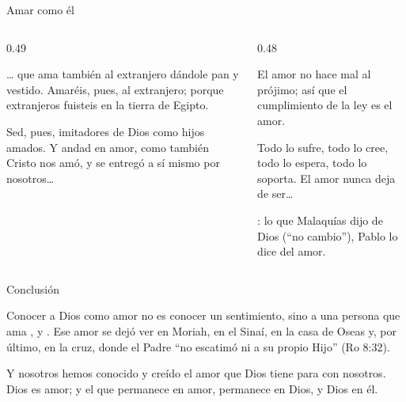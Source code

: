 \begin{frame}{Amar como él}
\begin{columns}[t,onlytextwidth]
\begin{column}{0.49\textwidth}
\begin{cita}\ldots{} que ama también al extranjero dándole pan y vestido. Amaréis, pues, al extranjero; porque extranjeros fuisteis en la tierra de Egipto.\end{cita}
\begin{cita}Sed, pues, imitadores de Dios como hijos amados. Y andad en amor, como también Cristo nos amó, y se entregó a sí mismo por nosotros\ldots{}\end{cita}
\end{column}
\begin{column}{0.48\textwidth}
\begin{cita}El amor no hace mal al prójimo; así que el cumplimiento de la ley es el amor.\end{cita}
\begin{cita}Todo lo sufre, todo lo cree, todo lo espera, todo lo soporta. El amor nunca deja de ser\ldots{}\end{cita}
\scriptsize{}: lo que Malaquías dijo de Dios (``no cambio''), Pablo lo dice del amor.
\end{column}
\end{columns}
\end{frame}

\begin{frame}{Conclusión}
\begin{tcolorbox}[colback=papiro,colframe=dorado,boxrule=1.2pt,arc=3pt]
\small Conocer a Dios como amor no es conocer un sentimiento, sino a una persona que ama ,  y . Ese amor se dejó ver en Moriah, en el Sinaí, en la casa de Oseas y, por último, en la cruz, donde el Padre ``no escatimó ni a su propio Hijo'' (Ro 8:32).
\end{tcolorbox}
\begin{cita}Y nosotros hemos conocido y creído el amor que Dios tiene para con nosotros. Dios es amor; y el que permanece en amor, permanece en Dios, y Dios en él.\end{cita}
\end{frame}

